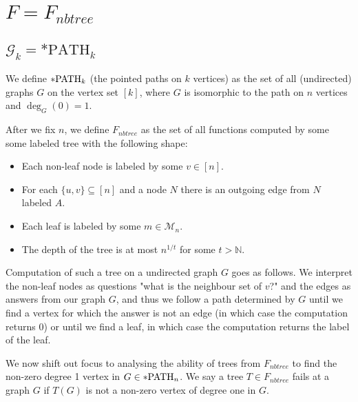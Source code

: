 \chapter{$F=F_{nbtree}$}

\section{$\mathcal{G}_k=*\text{PATH}_k$}

\begin{defi}
We define $*\text{PATH}_k$ (the pointed paths on $k$ vertices) as the set of all (undirected) graphs $G$ on the vertex set $[k]$, where $G$ is isomorphic to the path on $n$ vertices and $\deg_G(0)=1$.
\end{defi}

\begin{defi}
After we fix $n$, we define $F_{nbtree}$ as the set of all functions computed by some some labeled tree with the following shape:

\begin{itemize}
\item Each non-leaf node is labeled by some $v\in[n]$. 
\item For each $\{u,v\} \subseteq [n]$ and a node $N$ there is an outgoing edge from $N$ labeled $A$.
\item Each leaf is labeled by some $m\in \mathcal{M}_n$.
\item The depth of the tree is at most $n^{1/t}$ for some $t>\mathbb{N}$.
\end{itemize}

Computation of such a tree on a undirected graph $G$ goes as follows. We interpret the non-leaf nodes as questions "what is the neighbour set of $v$?" and the edges as answers from our graph $G$, and thus we follow a path determined by $G$ until we find a vertex for which the answer is not an edge (in which case the computation returns $0$) or until we find a leaf, in which case the computation returns the label of the leaf.
\end{defi}

We now shift out focus to analysing the ability of trees from $F_{nbtree}$ to find the non-zero degree 1 vertex in $G\in *\text{PATH}_n$. We say a tree $T\in F_{nbtree}$ fails at a graph $G$ if $T(G)$ is not a non-zero vertex of degree one in $G$.

